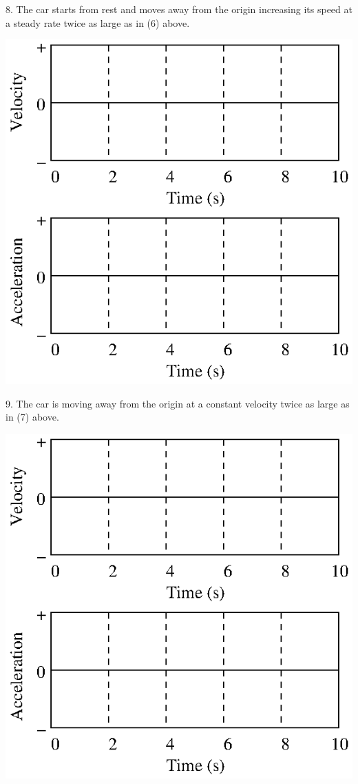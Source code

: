 8. The car starts from rest and moves away from the origin increasing its speed
at a steady rate twice as large as in (6) above.

\vspace{0.3cm}
{\par\centering \includegraphics{changing_fig12.eps} \par}
\vspace{0.3cm}

9. The car is moving away from the origin at a constant velocity twice as large
as in (7) above.

\vspace{0.3cm}
{\par\centering \includegraphics{changing_fig12.eps} \par}
\vspace{0.3cm}

